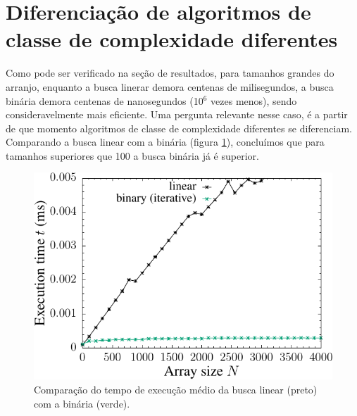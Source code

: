 \section{Diferenciação de algoritmos de classe de complexidade diferentes}

Como pode ser verificado na seção de resultados, para tamanhos grandes do arranjo, enquanto a busca linerar demora centenas de milisegundos, a busca binária demora centenas de nanosegundos (10$^6$ vezes menos), sendo consideravelmente mais eficiente. Uma pergunta relevante nesse caso, é a partir de que momento algoritmos de classe de complexidade diferentes se diferenciam. Comparando a busca linear com a binária (figura \ref{fig:lvsb_search_time}), concluímos que para tamanhos superiores que 100 a busca binária já é superior.

\begin{figure}[H]
  \centering
  \includegraphics[scale=1.2]{../plots/lvsb_search_time.pdf}
  \caption{Comparação do tempo de execução médio da busca linear (preto) com a binária (verde).}
  \label{fig:lvsb_search_time}
\end{figure} 

%
%
